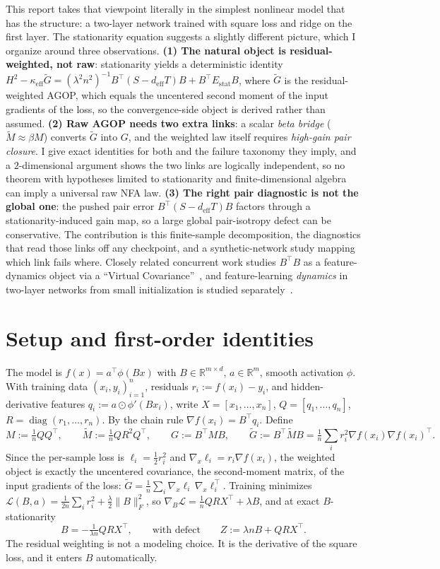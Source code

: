 \documentclass[10pt]{article}
\newcommand{\R}{\mathbb{R}}
\newcommand{\T}{^{\!\top}}
\newcommand{\eff}{\mathrm{eff}}
\newcommand{\stat}{\mathrm{stat}}
\newcommand{\Gw}{\widetilde{G}}
\newcommand{\Mw}{\widetilde{M}}
\DeclareMathOperator{\diag}{diag}
\begin{document}
This report takes that viewpoint literally in the simplest nonlinear model that has the structure: a two-layer network trained with square loss and ridge on the first layer. The stationarity equation suggests a slightly different picture, which I organize around three observations. \textbf{(1) The natural object is residual-weighted, not raw}: stationarity yields a deterministic identity $H^2 - \kappa_{\eff}\Gw = (\lambda^2 n^2)^{-1} B\T(S - d_{\eff}T)B + B\T E_{\stat}B$, where $\Gw$ is the residual-weighted AGOP, which equals the uncentered second moment of the input gradients of the loss, so the convergence-side object is derived rather than assumed. \textbf{(2) Raw AGOP needs two extra links}: a scalar \emph{beta bridge} ($\Mw \approx \beta M$) converts $\Gw$ into $G$, and the weighted law itself requires \emph{high-gain pair closure}. I give exact identities for both and the failure taxonomy they imply, and a $2$-dimensional argument shows the two links are logically independent, so no theorem with hypotheses limited to stationarity and finite-dimensional algebra can imply a universal raw NFA law. \textbf{(3) The right pair diagnostic is not the global one}: the pushed pair error $B\T(S - d_{\eff}T)B$ factors through a stationarity-induced gain map, so a large global pair-isotropy defect can be conservative. The contribution is this finite-sample decomposition, the diagnostics that read those links off any checkpoint, and a synthetic-network study mapping which link fails where. Closely related concurrent work studies $B\T B$ as a feature-dynamics object via a ``Virtual Covariance''~\cite{cha2026virtual}, and feature-learning \emph{dynamics} in two-layer networks from small initialization is studied separately~\cite{kunin2025agf}.

\section{Setup and first-order identities}

The model is $f(x) = a\T \phi(Bx)$ with $B \in \R^{m\times d}$, $a \in \R^m$, smooth activation $\phi$. With training data $(x_i,y_i)_{i=1}^n$, residuals $r_i := f(x_i)-y_i$, and hidden-derivative features $q_i := a \odot \phi'(Bx_i)$, write $X = [x_1,\dots,x_n]$, $Q = [q_1,\dots,q_n]$, $R = \diag(r_1,\dots,r_n)$. By the chain rule $\nabla f(x_i) = B\T q_i$. Define
\[
M := \tfrac{1}{n}QQ\T, \qquad \Mw := \tfrac{1}{n}QR^2Q\T, \qquad G := B\T M B, \qquad \Gw := B\T \Mw B = \tfrac{1}{n}\sum_i r_i^2 \nabla f(x_i)\nabla f(x_i)\T.
\]
Since the per-sample loss is $\ell_i = \tfrac12 r_i^2$ and $\nabla_x \ell_i = r_i \nabla f(x_i)$, the weighted object is exactly the uncentered covariance, the second-moment matrix, of the input gradients of the loss: $\Gw = \tfrac1n \sum_i \nabla_x\ell_i\,\nabla_x\ell_i\T$. Training minimizes $\mathcal L(B,a) = \tfrac{1}{2n}\sum_i r_i^2 + \tfrac{\lambda}{2}\|B\|_F^2$, so $\nabla_B \mathcal L = \tfrac{1}{n}QRX\T + \lambda B$, and at exact $B$-stationarity
\[
B = -\tfrac{1}{\lambda n}QRX\T, \qquad\text{with defect}\qquad Z := \lambda n B + QRX\T.
\]
The residual weighting is not a modeling choice. It is the derivative of the square loss, and it enters $B$ automatically.
\end{document}
